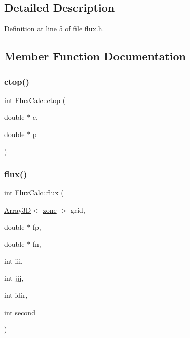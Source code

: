 \subsection{Detailed Description}


Definition at line 5 of file flux.\+h.



\subsection{Member Function Documentation}
\mbox{\label{classFluxCalc_a9c9df42bed3b97586bc268cfee3965c7}} 
\subsubsection{\texorpdfstring{ctop()}{ctop()}}
{\footnotesize\ttfamily int Flux\+Calc\+::ctop (\begin{DoxyParamCaption}\item[{double $\ast$}]{c,  }\item[{double $\ast$}]{p }\end{DoxyParamCaption})}

\mbox{\label{classFluxCalc_ae1b566f7c632d2dcb123e77d2c89bf5c}} 
\subsubsection{\texorpdfstring{flux()}{flux()}}
{\footnotesize\ttfamily int Flux\+Calc\+::flux (\begin{DoxyParamCaption}\item[{\hyperlink{classTNT_1_1Array3D}{Array3D}$<$ \hyperlink{structzone}{zone} $>$}]{grid,  }\item[{double $\ast$}]{fp,  }\item[{double $\ast$}]{fn,  }\item[{int}]{iii,  }\item[{int}]{jjj,  }\item[{int}]{idir,  }\item[{int}]{second }\end{DoxyParamCaption})}

\mbox{\label{classFluxCalc_af23d3c12de11a7090fa043479c523c11}} 
